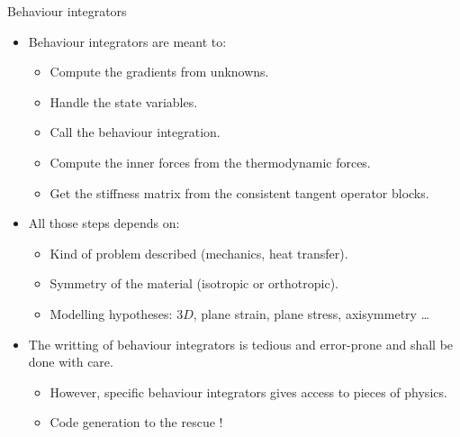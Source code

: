 \documentclass{beamer}
\begin{document}
\begin{frame}{Behaviour
    integrators}
  \begin{itemize}
    \item Behaviour integrators are meant to:
    \begin{itemize}
      \item Compute the gradients from unknowns.
      \item Handle the state variables.
      \item Call the behaviour integration.
      \item Compute the inner forces from the thermodynamic
      forces.
      \item Get the stiffness matrix from the consistent
      tangent operator blocks.
    \end{itemize}
  \end{itemize}
  \begin{itemize}
    \item All those steps depends on:
    \begin{itemize}
      \item Kind of problem described (mechanics, heat
      transfer).
      \item Symmetry of the material (isotropic or
      orthotropic).
      \item Modelling hypotheses: \(3D\), plane strain,
      plane stress, axisymmetry \ldots
    \end{itemize}
  \end{itemize}
  \begin{itemize}
    \item The writting of behaviour integrators is tedious and
    error-prone and shall be done with care.
    \begin{itemize}
      \item However, specific behaviour integrators gives
      access to pieces of physics.
      \item Code generation to the rescue !
    \end{itemize}
  \end{itemize}
\end{frame}
\end{document}
